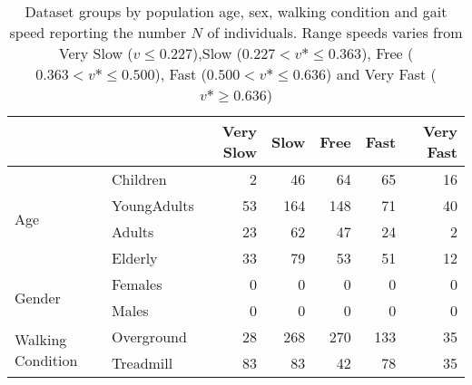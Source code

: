 \begin{table}
\centering
\caption{Dataset groups by population age, sex, walking condition and gait speed reporting the number $N$ of individuals. Range speeds varies from Very Slow ($v \leq 0.227$),Slow ($0.227 < v* \leq 0.363$), Free ($0.363 < v* \leq 0.500$), Fast ($0.500 < v* \leq  0.636$) and Very Fast ($v* \geq 0.636$)}
\label{tab:table1}
\begin{tabular}{llrrrrr}
\toprule
                  &           &  Very Slow &       Slow &       Free &       Fast &  Very Fast \\
\midrule
\multirow{4}{*}{Age} & Children &          2 &         46 &         64 &         65 &         16 \\
                  & YoungAdults &         53 &        164 &        148 &         71 &         40 \\
                  & Adults &         23 &         62 &         47 &         24 &          2 \\
                  & Elderly &         33 &         79 &         53 &         51 &         12 \\
\cline{1-7}
\multirow{2}{*}{Gender} & Females &          0 &          0 &          0 &          0 &          0 \\
                  & Males &          0 &          0 &          0 &          0 &          0 \\
\cline{1-7}
\multirow{2}{*}{Walking Condition} & Overground &         28 &        268 &        270 &        133 &         35 \\
                  & Treadmill &         83 &         83 &         42 &         78 &         35 \\
\bottomrule
\end{tabular}
\end{table}
